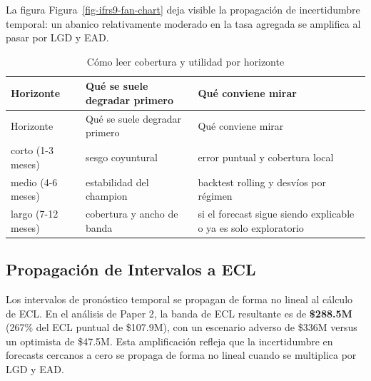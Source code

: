 \documentclass[
  spanish,
  11pt,
  letterpaper,
]{scrbook}
\theoremstyle{plain}
\theoremstyle{remark}
\begin{document}
La figura Figura~\ref{fig-ifrs9-fan-chart} deja visible la propagación
de incertidumbre temporal: un abanico relativamente moderado en la tasa
agregada se amplifica al pasar por LGD y EAD.

\begin{longtable}[]{@{}
  >{\raggedright\arraybackslash}p{}
  >{\raggedright\arraybackslash}p{}
  >{\raggedright\arraybackslash}p{}@{}}
\caption{Cómo leer cobertura y utilidad por
horizonte}\label{tbl-ts-horizon-reading}\tabularnewline
\toprule\noalign{}
\begin{minipage}[b]{\linewidth}\raggedright
Horizonte
\end{minipage} & \begin{minipage}[b]{\linewidth}\raggedright
Qué se suele degradar primero
\end{minipage} & \begin{minipage}[b]{\linewidth}\raggedright
Qué conviene mirar
\end{minipage} \\
\midrule\noalign{}
\endfirsthead
\toprule\noalign{}
\begin{minipage}[b]{\linewidth}\raggedright
Horizonte
\end{minipage} & \begin{minipage}[b]{\linewidth}\raggedright
Qué se suele degradar primero
\end{minipage} & \begin{minipage}[b]{\linewidth}\raggedright
Qué conviene mirar
\end{minipage} \\
\midrule\noalign{}
\endhead
\bottomrule\noalign{}
\endlastfoot
corto (1-3 meses) & sesgo coyuntural & error puntual y cobertura
local \\
medio (4-6 meses) & estabilidad del champion & backtest rolling y
desvíos por régimen \\
largo (7-12 meses) & cobertura y ancho de banda & si el forecast sigue
siendo explicable o ya es solo exploratorio \\
\end{longtable}

\subsection{Propagación de Intervalos a
ECL}\label{propagaciuxf3n-de-intervalos-a-ecl}

Los intervalos de pronóstico temporal se propagan de forma no lineal al
cálculo de ECL. En el análisis de Paper 2, la banda de ECL resultante es
de \textbf{\$288.5M} (267\% del ECL puntual de \$107.9M), con un
escenario adverso de \$336M versus un optimista de \$47.5M. Esta
amplificación refleja que la incertidumbre en forecasts cercanos a cero
se propaga de forma no lineal cuando se multiplica por LGD y EAD.
\end{document}

